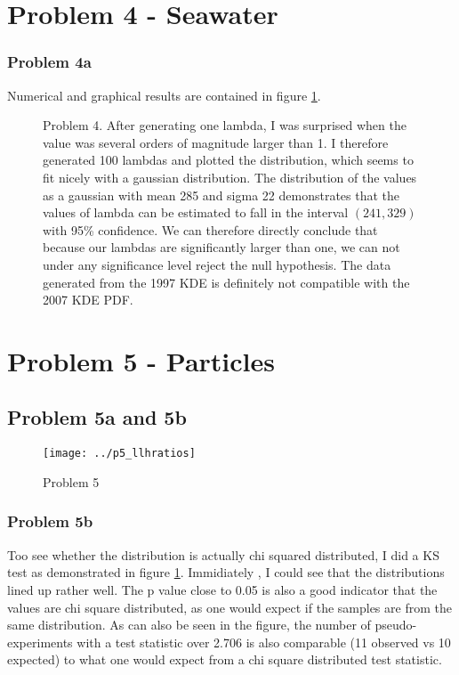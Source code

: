 \documentclass[a4paper,11pt]{article}
\begin{document}
\section{Problem 4 - Seawater}
\subsubsection{Problem 4a}
Numerical and graphical results are contained in figure \ref{p4_seawater}.


\begin{figure}[H]
  \centering
  \caption{Problem 4.
  After generating one lambda, I was surprised when the value was several orders of magnitude larger than 1.
  I therefore generated 100 lambdas and plotted the distribution, which seems to fit nicely with a gaussian distribution.
The distribution of the values as a gaussian with mean 285 and sigma 22 demonstrates that the values of lambda can be estimated to fall in the interval $(241, 329)$ with 95\% confidence.
We can therefore directly conclude that because our lambdas are significantly larger than one, we can not under any significance level reject the null hypothesis.
The data generated from the 1997 KDE is definitely not compatible with the 2007 KDE PDF. }
  \label{p4_seawater}
\end{figure}

\section{Problem 5 - Particles}
\subsection{Problem 5a and 5b}
\begin{figure}[H]
  \texttt{[image: ../p5\_llhratios]}
  \caption{Problem 5}
  \label{p5_llhratios}
\end{figure}

\subsubsection{Problem 5b}
Too see whether the distribution is actually chi squared distributed, I did a KS test as demonstrated in figure \ref{p4_seawater}.
Immidiately , I could see that the distributions lined up rather well.
The p value close to 0.05 is also a good indicator that the values are chi square distributed, as one would expect if the samples are from the same distribution.
As can also be seen in the figure, the number of pseudo-experiments with a test statistic over 2.706 is also comparable (11 observed vs 10 expected) to what one would expect from a chi square distributed test statistic.
\end{document}
